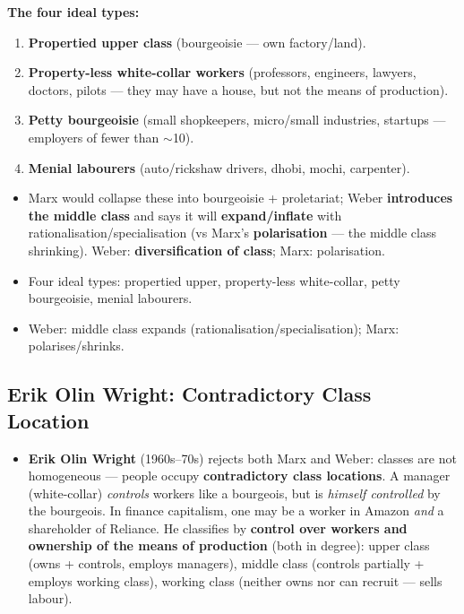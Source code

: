 \begin{DataFact}
\textbf{The four ideal types:}
\begin{enumerate}
\item \textbf{Propertied upper class} (bourgeoisie --- own factory/land).
\item \textbf{Property-less white-collar workers} (professors, engineers, lawyers, doctors, pilots --- they may have a house, but not the means of production).
\item \textbf{Petty bourgeoisie} (small shopkeepers, micro/small industries, startups --- employers of fewer than $\sim$10).
\item \textbf{Menial labourers} (auto/rickshaw drivers, dhobi, mochi, carpenter).
\end{enumerate}
\begin{itemize}
\item Marx would collapse these into bourgeoisie + proletariat; Weber \textbf{introduces the middle class} and says it will \textbf{expand/inflate} with rationalisation/specialisation (vs Marx's \textbf{polarisation} --- the middle class shrinking). Weber: \textbf{diversification of class}; Marx: polarisation.
\end{itemize}
\end{DataFact}

\begin{QuickRevision}
\begin{itemize}
\item Four ideal types: propertied upper, property-less white-collar, petty bourgeoisie, menial labourers.
\item Weber: middle class expands (rationalisation/specialisation); Marx: polarises/shrinks.
\end{itemize}
\end{QuickRevision}

\sectiondivider

\subsection{Erik Olin Wright: Contradictory Class Location}

\begin{KeyConcept}
\begin{itemize}
\item \textbf{Erik Olin Wright} (1960s--70s) rejects both Marx and Weber: classes are not homogeneous --- people occupy \textbf{contradictory class locations}. A manager (white-collar) \textit{controls} workers like a bourgeois, but is \textit{himself controlled} by the bourgeois. In finance capitalism, one may be a worker in Amazon \textit{and} a shareholder of Reliance. He classifies by \textbf{control over workers and ownership of the means of production} (both in degree): upper class (owns + controls, employs managers), middle class (controls partially + employs working class), working class (neither owns nor can recruit --- sells labour).
\end{itemize}
\end{KeyConcept}

